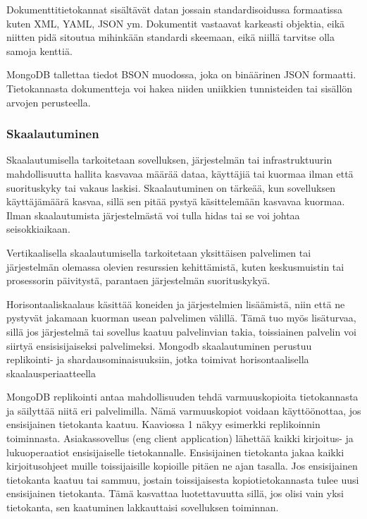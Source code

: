 Dokumenttitietokannat sisältävät datan jossain standardisoidussa formaatissa kuten XML, YAML, JSON ym.
Dokumentit vastaavat karkeasti objektia, eikä niitten pidä sitoutua mihinkään standardi skeemaan, 
eikä niillä tarvitse olla samoja kenttiä.
\medskip


MongoDB tallettaa tiedot BSON muodossa, joka on binäärinen JSON formaatti.
Tietokannasta dokumentteja voi hakea niiden uniikkien tunnisteiden tai sisällön arvojen perusteella.
\medskip






\subsubsection{Skaalautuminen}


Skaalautumisella tarkoitetaan sovelluksen, järjestelmän tai infrastruktuurin
mahdollisuutta hallita kasvavaa määrää dataa, käyttäjiä tai kuormaa ilman että suorituskyky tai vakaus laskisi.
Skaalautuminen on tärkeää, kun sovelluksen käyttäjämäärä kasvaa, sillä sen pitää pystyä käsittelemään kasvavaa kuormaa.
Ilman skaalautumista järjestelmästä voi tulla hidas tai se voi johtaa seisokkiaikaan.
\medskip

Vertikaalisella skaalautumisella tarkoitetaan yksittäisen palvelimen tai järjestelmän olemassa olevien resurssien kehittämistä, 
kuten keskusmuistin tai prosessorin päivitystä, parantaen järjestelmän suorituskykyä.
\medskip

Horisontaaliskaalaus käsittää koneiden ja järjestelmien lisäämistä, niin että ne pystyvät jakamaan kuorman usean palvelimen välillä.
Tämä tuo myös lisäturvaa, sillä jos järjestelmä tai sovellus kaatuu palvelinvian takia, 
toissiainen palvelin voi siirtyä ensisisijaiseksi palvelimeksi. 
Mongodb skaalautuminen perustuu replikointi- ja shardausominaisuuksiin, jotka toimivat horisontaalisella skaalausperiaatteella 
\medskip




MongoDB replikointi antaa mahdollisuuden tehdä varmuuskopioita tietokannasta ja säilyttää niitä eri palvelimilla.
Nämä varmuuskopiot voidaan käyttöönottaa, jos ensisijainen tietokanta kaatuu. 
Kaaviossa 1 näkyy esimerkki replikoinnin toiminnasta. 
Asiakassovellus (eng client application) lähettää kaikki kirjoitus- ja lukuoperaatiot ensisijaiselle tietokannalle. 
Ensisijainen tietokanta jakaa kaikki kirjoitusohjeet muille toissijaisille kopioille pitäen ne ajan tasalla.
Jos ensisijainen tietokanta kaatuu tai sammuu, jostain toissijaisesta kopiotietokannasta tulee uusi ensisijainen tietokanta.
Tämä kasvattaa luotettavuutta sillä, jos olisi vain yksi tietokanta, sen kaatuminen lakkauttaisi sovelluksen toiminnan. 
\medskip
\bigskip

